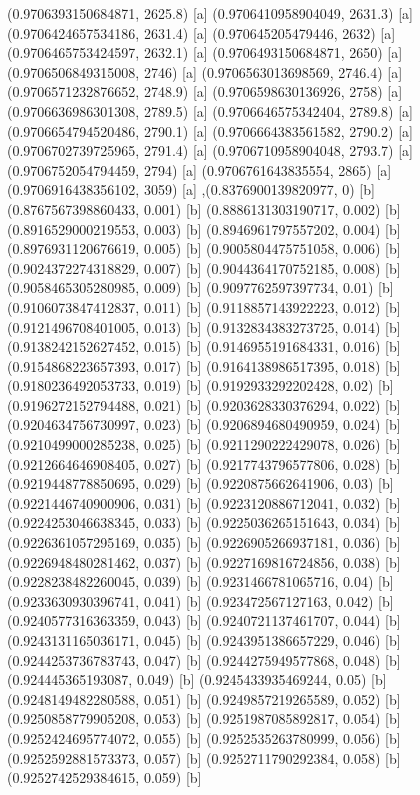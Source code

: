 {{{(0.9706393150684871, 2625.8) [a] 
(0.9706410958904049, 2631.3) [a] 
(0.9706424657534186, 2631.4) [a] 
(0.970645205479446, 2632) [a] 
(0.9706465753424597, 2632.1) [a] 
(0.9706493150684871, 2650) [a] 
(0.9706506849315008, 2746) [a] 
(0.9706563013698569, 2746.4) [a] 
(0.9706571232876652, 2748.9) [a] 
(0.9706598630136926, 2758) [a] 
(0.9706636986301308, 2789.5) [a] 
(0.9706646575342404, 2789.8) [a] 
(0.9706654794520486, 2790.1) [a] 
(0.9706664383561582, 2790.2) [a] 
(0.9706702739725965, 2791.4) [a] 
(0.9706710958904048, 2793.7) [a] 
(0.9706752054794459, 2794) [a] 
(0.9706761643835554, 2865) [a] 
(0.9706916438356102, 3059) [a] 
},{(0.8376900139820977, 0) [b] 
(0.8767567398860433, 0.001) [b] 
(0.8886131303190717, 0.002) [b] 
(0.8916529000219553, 0.003) [b] 
(0.8946961797557202, 0.004) [b] 
(0.8976931120676619, 0.005) [b] 
(0.9005804475751058, 0.006) [b] 
(0.9024372274318829, 0.007) [b] 
(0.9044364170752185, 0.008) [b] 
(0.9058465305280985, 0.009) [b] 
(0.9097762597397734, 0.01) [b] 
(0.9106073847412837, 0.011) [b] 
(0.9118857143922223, 0.012) [b] 
(0.9121496708401005, 0.013) [b] 
(0.9132834383273725, 0.014) [b] 
(0.9138242152627452, 0.015) [b] 
(0.9146955191684331, 0.016) [b] 
(0.9154868223657393, 0.017) [b] 
(0.9164138986517395, 0.018) [b] 
(0.9180236492053733, 0.019) [b] 
(0.9192933292202428, 0.02) [b] 
(0.9196272152794488, 0.021) [b] 
(0.9203628330376294, 0.022) [b] 
(0.9204634756730997, 0.023) [b] 
(0.9206894680490959, 0.024) [b] 
(0.9210499000285238, 0.025) [b] 
(0.9211290222429078, 0.026) [b] 
(0.9212664646908405, 0.027) [b] 
(0.9217743796577806, 0.028) [b] 
(0.9219448778850695, 0.029) [b] 
(0.9220875662641906, 0.03) [b] 
(0.9221446740900906, 0.031) [b] 
(0.9223120886712041, 0.032) [b] 
(0.9224253046638345, 0.033) [b] 
(0.9225036265151643, 0.034) [b] 
(0.9226361057295169, 0.035) [b] 
(0.9226905266937181, 0.036) [b] 
(0.9226948480281462, 0.037) [b] 
(0.9227169816724856, 0.038) [b] 
(0.9228238482260045, 0.039) [b] 
(0.9231466781065716, 0.04) [b] 
(0.9233630930396741, 0.041) [b] 
(0.923472567127163, 0.042) [b] 
(0.9240577316363359, 0.043) [b] 
(0.9240721137461707, 0.044) [b] 
(0.9243131165036171, 0.045) [b] 
(0.9243951386657229, 0.046) [b] 
(0.9244253736783743, 0.047) [b] 
(0.9244275949577868, 0.048) [b] 
(0.924445365193087, 0.049) [b] 
(0.9245433935469244, 0.05) [b] 
(0.9248149482280588, 0.051) [b] 
(0.9249857219265589, 0.052) [b] 
(0.9250858779905208, 0.053) [b] 
(0.9251987085892817, 0.054) [b] 
(0.9252424695774072, 0.055) [b] 
(0.9252535263780999, 0.056) [b] 
(0.9252592881573373, 0.057) [b] 
(0.9252711790292384, 0.058) [b] 
(0.9252742529384615, 0.059) [b] 
}}}

